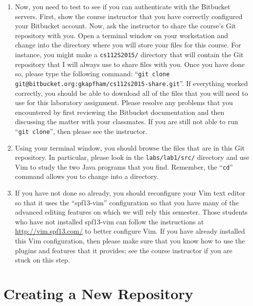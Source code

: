 \begin{enumerate}
  \item Now, you need to test to see if you can authenticate with the Bitbucket servers.  First, show the course
    instructor that you have correctly configured your Bitbucket account.  Now, ask the instructor to share the course's
    Git repository with you.  Open a terminal window on your workstation and change into the directory where you will
    store your files for this course.  For instance, you might make a {\tt cs112S2015/} directory that will contain the
    Git repository that I will always use to share files with you.  Once you have done so, please type the following
    command: ``{\tt git clone git@bitbucket.org:gkapfham/cs112s2015-share.git}''.  If everything worked correctly, you
    should be able to download all of the files that you will need to use for this laboratory assignment. Please resolve
    any problems that you encountered by first reviewing the Bitbucket documentation and then discussing the matter
    with your classmates. If you are still not able to run ``{\tt git clone}'', then please see the instructor.

  \item Using your terminal window, you should browse the files that are in this Git repository.  In particular, please
    look in the {\tt labs/lab1/src/} directory and use Vim to study the two Java programs that you find.  Remember, the
    ``{\tt cd}'' command allows you to change into a directory. 

  \item If you have not done so already, you should reconfigure your Vim text editor so that it uses the ``spf13-vim''
    configuration so that you have many of the advanced editing features on which we will rely this semester. Those
    students who have not installed spf13-vim can follow the instructions at \url{http://vim.spf13.com/} to better
    configure Vim. If you have already installed this Vim configuration, then please make sure that you know how to use
    the plugins and features that it provides; see the course instructor if you are stuck on this step.

\end{enumerate}

\section*{Creating a New Repository}

